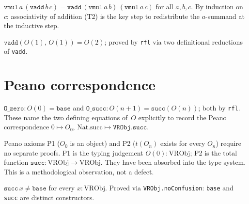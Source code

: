 \begin{theorem}[T3 --- Distributivity]
\label{thm:T3}
\leanok
{}
$\texttt{vmul}\,a\,(\texttt{vadd}\,b\,c) = \texttt{vadd}\,(\texttt{vmul}\,a\,b)\,(\texttt{vmul}\,a\,c)$
for all $a, b, c$.  By induction on~$c$; associativity of addition (T2)
is the key step to redistribute the $a$-summand at the inductive step.
\end{theorem}

\begin{theorem}[T4 --- $O_1 + O_1 = O_2$]
\label{thm:T4}
\leanok
{}
$\texttt{vadd}(O(1),\,O(1)) = O(2)$; proved by \texttt{rfl} via two
definitional reductions of \texttt{vadd}.
\end{theorem}

\section{Peano correspondence}
\label{sec:vr_peano}

\begin{theorem}
\label{thm:peano_corr}
\leanok
{}
$\texttt{O\_zero}: O(0) = \texttt{base}$ and $\texttt{O\_succ}: O(n+1) =
\texttt{succ}(O(n))$; both by \texttt{rfl}.  These name the two defining
equations of~$O$ explicitly to record the Peano correspondence $0
\mapsto O_0$, $\mathrm{Nat.succ} \mapsto \texttt{VRObj.succ}$.
\end{theorem}

\begin{remark}[P1 and P2]
\label{rem:P1P2_detail}
\leanok
{}
Peano axioms P1 ($O_0$ is an object) and P2 ($t(O_n)$ exists for every
$O_n$) require no separate proofs.  P1 is the typing judgement $O(0) :
\mathrm{VRObj}$; P2 is the total function $\texttt{succ} :
\mathrm{VRObj} \to \mathrm{VRObj}$.  They have been absorbed into the
type system.  This is a methodological observation, not a defect.
\end{remark}

\begin{theorem}
\label{thm:P3}
\leanok
{}
$\texttt{succ}\,x \ne \texttt{base}$ for every $x : \mathrm{VRObj}$.
Proved via \texttt{VRObj.noConfusion}: \texttt{base} and \texttt{succ}
are distinct constructors.
\end{theorem}

